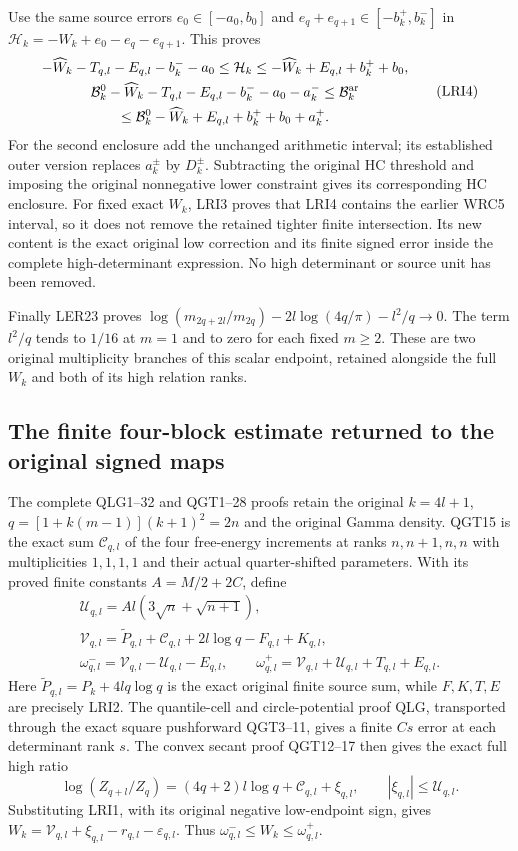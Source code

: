 \documentclass[11pt,a4paper]{article}
\begin{document}
Use the same source errors $e_0\in[-a_0,b_0]$ and
$e_q+e_{q+1}\in[-b_k^+,b_k^-]$ in
$\mathcal H_k=-W_k+e_0-e_q-e_{q+1}$. This proves
\[
\begin{gathered}
 -\widehat W_k-T_{q,l}-E_{q,l}-b_k^--a_0
 \leq\mathcal H_k
 \leq-\widehat W_k+E_{q,l}+b_k^++b_0,\\
 \mathcal B_k^0-\widehat W_k-T_{q,l}-E_{q,l}-b_k^--a_0-a_k^-
 \leq\mathcal B_k^{\rm ar}\\
 \leq\mathcal B_k^0-\widehat W_k+E_{q,l}+b_k^++b_0+a_k^+.
\end{gathered}\tag{LRI4}
\]
For the second enclosure add the unchanged arithmetic interval;
its established outer version replaces $a_k^\pm$ by $D_k^\pm$.
Subtracting the original HC threshold and imposing the original
nonnegative lower constraint gives its corresponding HC enclosure.
For fixed exact $W_k$, LRI3 proves that LRI4 contains the earlier
WRC5 interval, so it does not remove the retained tighter finite
intersection. Its new content is the exact original low correction
and its finite signed error inside the complete high-determinant
expression. No high determinant or source unit has been removed.

Finally LER23 proves
$\log(m_{2q+2l}/m_{2q})-2l\log(4q/\pi)-l^2/q\to0$.
The term $l^2/q$ tends to $1/16$ at $m=1$ and to zero for
each fixed $m\geq2$. These are two original multiplicity
branches of this scalar endpoint, retained alongside the full
$W_k$ and both of its high relation ranks.


\subsection{The finite four-block estimate returned to the original signed maps}

The complete QLG1--32 and QGT1--28 proofs retain the original
$k=4l+1$, $q=[1+k(m-1)](k+1)^2=2n$ and the original Gamma
density. QGT15 is the exact sum $\mathcal C_{q,l}$ of the four
free-energy increments at ranks $n,n+1,n,n$ with multiplicities
$1,1,1,1$ and their actual quarter-shifted parameters. With its
proved finite constants $A=M/2+2C$, define
\[
\begin{gathered}
 \mathcal U_{q,l}=Al(3\sqrt n+\sqrt{n+1}),\\
 \mathcal V_{q,l}=\widetilde P_{q,l}+\mathcal C_{q,l}
                         +2l\log q-F_{q,l}+K_{q,l},\\
 \omega_{q,l}^-=\mathcal V_{q,l}-\mathcal U_{q,l}-E_{q,l},
 \qquad
 \omega_{q,l}^+=\mathcal V_{q,l}
                        +\mathcal U_{q,l}+T_{q,l}+E_{q,l}.
\end{gathered}\tag{QRI1}
\]
Here $\widetilde P_{q,l}=P_k+4lq\log q$ is the exact original
finite source sum, while $F,K,T,E$ are precisely LRI2. The
quantile-cell and circle-potential proof QLG, transported through
the exact square pushforward QGT3--11, gives a finite $Cs$ error
at each determinant rank $s$. The convex secant proof QGT12--17
then gives the exact full high ratio
\[
 \log(Z_{q+l}/Z_q)=(4q+2)l\log q+\mathcal C_{q,l}+\xi_{q,l},
 \qquad |\xi_{q,l}|\le\mathcal U_{q,l}.
\]
Substituting LRI1, with its original negative low-endpoint sign,
gives
$W_k=\mathcal V_{q,l}+\xi_{q,l}-r_{q,l}-\varepsilon_{q,l}$.
Thus $\omega_{q,l}^-\le W_k\le\omega_{q,l}^+$.
\end{document}
